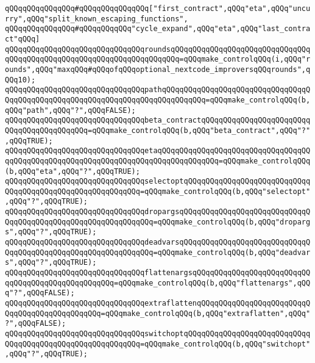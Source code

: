 \newline
\verb|qQQqqQQqqQQqqQQq#qQQqqQQqqQQqqQQq["first_contract",qQQq"eta",qQQq"uncurry",qQQq"split_known_escaping_functions",|\newline
\verb|qQQqqQQqqQQqqQQq#qQQqqQQqqQQq"cycle_expand",qQQq"eta",qQQq"last_contract"qQQq]|\newline
\newline
\verb|qQQqqQQqqQQqqQQqqQQqqQQqqQQqqQQqroundsqQQqqQQqqQQqqQQqqQQqqQQqqQQqqQQqqQQqqQQqqQQqqQQqqQQqqQQqqQQqqQQqqQQqqQQq=qQQqmake_controlqQQq(i,qQQq"rounds",qQQq"maxqQQq#qQQqofqQQqoptional_nextcode_improversqQQqrounds",qQQq10);|\newline
\verb|qQQqqQQqqQQqqQQqqQQqqQQqqQQqqQQqpathqQQqqQQqqQQqqQQqqQQqqQQqqQQqqQQqqQQqqQQqqQQqqQQqqQQqqQQqqQQqqQQqqQQqqQQqqQQqqQQq=qQQqmake_controlqQQq(b,qQQq"path",qQQq"?",qQQqFALSE);|\newline
\verb|qQQqqQQqqQQqqQQqqQQqqQQqqQQqqQQqbeta_contractqQQqqQQqqQQqqQQqqQQqqQQqqQQqqQQqqQQqqQQqqQQq=qQQqmake_controlqQQq(b,qQQq"beta_contract",qQQq"?",qQQqTRUE);|\newline
\newline
\verb|qQQqqQQqqQQqqQQqqQQqqQQqqQQqqQQqetaqQQqqQQqqQQqqQQqqQQqqQQqqQQqqQQqqQQqqQQqqQQqqQQqqQQqqQQqqQQqqQQqqQQqqQQqqQQqqQQqqQQq=qQQqmake_controlqQQq(b,qQQq"eta",qQQq"?",qQQqTRUE);|\newline
\verb|qQQqqQQqqQQqqQQqqQQqqQQqqQQqqQQqselectoptqQQqqQQqqQQqqQQqqQQqqQQqqQQqqQQqqQQqqQQqqQQqqQQqqQQqqQQqqQQq=qQQqmake_controlqQQq(b,qQQq"selectopt",qQQq"?",qQQqTRUE);|\newline
\verb|qQQqqQQqqQQqqQQqqQQqqQQqqQQqqQQqdropargsqQQqqQQqqQQqqQQqqQQqqQQqqQQqqQQqqQQqqQQqqQQqqQQqqQQqqQQqqQQqqQQq=qQQqmake_controlqQQq(b,qQQq"dropargs",qQQq"?",qQQqTRUE);|\newline
\newline
\verb|qQQqqQQqqQQqqQQqqQQqqQQqqQQqqQQqdeadvarsqQQqqQQqqQQqqQQqqQQqqQQqqQQqqQQqqQQqqQQqqQQqqQQqqQQqqQQqqQQqqQQq=qQQqmake_controlqQQq(b,qQQq"deadvars",qQQq"?",qQQqTRUE);|\newline
\verb|qQQqqQQqqQQqqQQqqQQqqQQqqQQqqQQqflattenargsqQQqqQQqqQQqqQQqqQQqqQQqqQQqqQQqqQQqqQQqqQQqqQQqqQQq=qQQqmake_controlqQQq(b,qQQq"flattenargs",qQQq"?",qQQqFALSE);|\newline
\verb|qQQqqQQqqQQqqQQqqQQqqQQqqQQqqQQqextraflattenqQQqqQQqqQQqqQQqqQQqqQQqqQQqqQQqqQQqqQQqqQQqqQQq=qQQqmake_controlqQQq(b,qQQq"extraflatten",qQQq"?",qQQqFALSE);|\newline
\newline
\verb|qQQqqQQqqQQqqQQqqQQqqQQqqQQqqQQqswitchoptqQQqqQQqqQQqqQQqqQQqqQQqqQQqqQQqqQQqqQQqqQQqqQQqqQQqqQQqqQQq=qQQqmake_controlqQQq(b,qQQq"switchopt",qQQq"?",qQQqTRUE);|\newline
